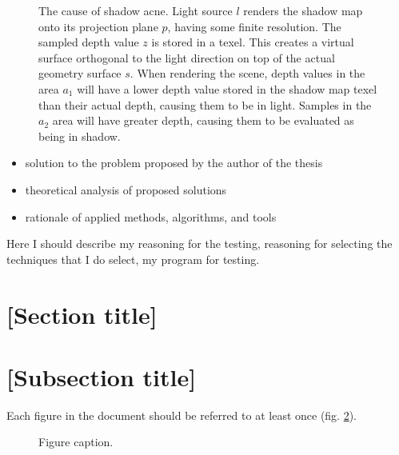 \begin{figure}
    \caption{The cause of shadow acne. Light source \(l\) renders the shadow map onto its projection plane \(p\), having some finite resolution. The sampled depth value \(z\) is stored in a texel. This creates a virtual surface orthogonal to the light direction on top of the actual geometry surface \(s\). When rendering the scene, depth values in the area \(a_1\) will have a lower depth value stored in the shadow map texel than their actual depth, causing them to be in light. Samples in the \(a_2\) area will have greater depth, causing them to be evaluated as being in shadow.}
    \label{fig:shadow_mapping_acne_explanation}
\end{figure}


\begin{itemize}
\item solution to the problem proposed by the author of the thesis
\item theoretical analysis of proposed solutions
\item rationale of applied methods, algorithms, and tools
\end{itemize}

Here I should describe my reasoning for the testing, reasoning for
selecting the techniques that I do select, my program for testing.

\section{[Section title]}

\section{[Subsection title]}

Each figure in the document should be referred to at least once (fig. \ref{fig:2}).

\begin{figure}
\centering
{}
\caption{Figure caption.} %
\label{fig:2}
\end{figure}


